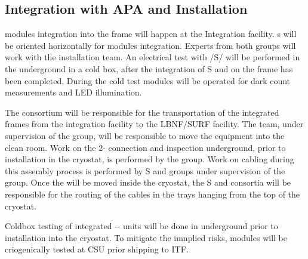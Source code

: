     



\subsection{Integration with APA and Installation}
\label{sec:fdsp-pd-install-pd-apa}

 modules integration into the  frame will happen at the Integration facility. s will be oriented horizontally for  modules integration. Experts from both groups will work with the installation team. 
An electrical test with /S/ will be performed 
in the underground in a cold box, after the integration of S and  on the  frame has been completed. During the cold test  modules will be operated for dark count measurements and LED illumination.

The  consortium will be responsible for the transportation of the integrated  frames from the integration facility to the LBNF/SURF facility. 
The  team, under supervision of the  group, will be responsible to move the equipment into the clean room. 
Work on the 2- connection and inspection underground, prior to installation in the cryostat, is performed by the  group.
Work on cabling during this assembly process is performed by S and  groups under supervision of the  group.
Once the  will be moved inside the cryostat, the S and  consortia will be responsible for the routing of the cables in the trays hanging from the top of the cryostat. 

Coldbox testing of integrated  -- units will be done in underground prior to installation into the cryostat. To mitigate the imnplied risks,  modules will be criogenically tested at CSU prior shipping to ITF.

